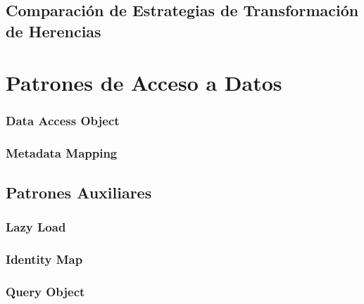 \documentclass[a4paper,slidestop,xcolor=pst,blue]{beamer}
\begin{document}
\subsection{Comparación de Estrategias de Transformación de Herencias}

\section{Patrones de Acceso a Datos}

\subsubsection{Data Access Object}

\subsubsection{Metadata Mapping}

\subsection{Patrones Auxiliares}

\subsubsection{Lazy Load}

\subsubsection{Identity Map}

\subsubsection{Query Object}
\end{document}

